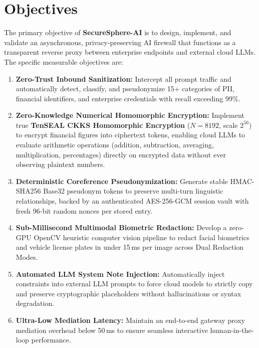 \section{Objectives}
The primary objective of \textbf{SecureSphere-AI} is to design, implement, and validate an asynchronous, privacy-preserving AI firewall that functions as a transparent reverse proxy between enterprise endpoints and external cloud LLMs. The specific measurable objectives are:
\begin{enumerate}[leftmargin=*]
    \item \textbf{Zero-Trust Inbound Sanitization:} Intercept all prompt traffic and automatically detect, classify, and pseudonymize 15+ categories of PII, financial identifiers, and enterprise credentials with recall exceeding 99\%.
    \item \textbf{Zero-Knowledge Numerical Homomorphic Encryption:} Implement true \textbf{TenSEAL CKKS Homomorphic Encryption} ($N=8192$, scale $2^{50}$) to encrypt financial figures into ciphertext tokens, enabling cloud LLMs to evaluate arithmetic operations (addition, subtraction, averaging, multiplication, percentages) directly on encrypted data without ever observing plaintext numbers.
    \item \textbf{Deterministic Coreference Pseudonymization:} Generate stable HMAC-SHA256 Base32 pseudonym tokens to preserve multi-turn linguistic relationships, backed by an authenticated AES-256-GCM session vault with fresh 96-bit random nonces per stored entry.
    \item \textbf{Sub-Millisecond Multimodal Biometric Redaction:} Develop a zero-GPU OpenCV heuristic computer vision pipeline to redact facial biometrics and vehicle license plates in under 15\,ms per image across Dual Redaction Modes.
    \item \textbf{Automated LLM System Note Injection:} Automatically inject constraints into external LLM prompts to force cloud models to strictly copy and preserve cryptographic placeholders without hallucinations or syntax degradation.
    \item \textbf{Ultra-Low Mediation Latency:} Maintain an end-to-end gateway proxy mediation overhead below 50\,ms to ensure seamless interactive human-in-the-loop performance.
\end{enumerate}

